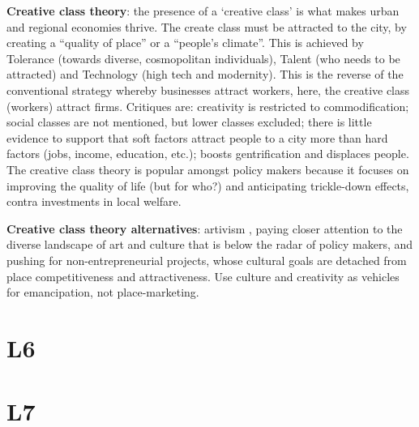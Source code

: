 \documentclass{article}
\newcommand{\alignedmarginpar}[1]{%
        \marginpar{\raggedright\small #1}
    }
\begin{document}
\textbf{Creative class theory}: the presence of a `creative class' is what makes urban and regional economies thrive. The create class must be attracted to the city, by creating a ``quality of place'' or a ``people's climate''. This is achieved by Tolerance (towards diverse, cosmopolitan individuals), Talent (who needs to be attracted) and Technology (high tech and modernity). This is the reverse of the conventional strategy whereby businesses attract workers, here, the creative class (workers) attract firms. Critiques are: creativity is restricted to commodification; social classes are not mentioned, but lower classes excluded; there is little evidence to support that soft factors attract people to a city more than hard factors (jobs, income, education, etc.); boosts gentrification and displaces people. The creative class theory is popular amongst policy makers because it focuses on improving the quality of life (but for who?) and anticipating trickle-down effects, contra investments in local welfare.

\textbf{Creative class theory alternatives}: artivism \alignedmarginpar{Hamburg}, paying closer attention to the diverse landscape of art and culture that is below the radar of policy makers, and pushing for non-entrepreneurial projects, whose cultural goals are detached from place competitiveness and attractiveness. Use culture and creativity as vehicles for emancipation, not place-marketing.

\textbf{}

\textbf{}

\textbf{}

\textbf{}

\pagebreak
\section{L6}

\textbf{}

\textbf{}

\textbf{}

\textbf{}

\textbf{}

\textbf{}

\textbf{}

\textbf{}

\textbf{}

\textbf{}

\textbf{}

\pagebreak
\section{L7}
\end{document}
